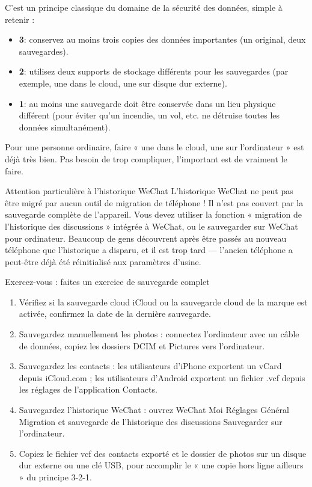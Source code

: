 
C'est un principe classique du domaine de la sécurité des données, simple à retenir :

\begin{itemize}
  \item \textbf{3}: conservez au moins trois copies des données importantes (un original, deux sauvegardes).
  \item \textbf{2}: utilisez deux supports de stockage différents pour les sauvegardes (par exemple, une dans le cloud, une sur disque dur externe).
  \item \textbf{1}: au moins une sauvegarde doit être conservée dans un lieu physique différent (pour éviter qu'un incendie, un vol, etc. ne détruise toutes les données simultanément).
\end{itemize}

Pour une personne ordinaire, faire « une dans le cloud, une sur l'ordinateur » est déjà très bien. Pas besoin de trop compliquer, l'important est de vraiment le faire.

\begin{tcbwarn}{Attention particulière à l'historique WeChat}
L'historique WeChat ne peut pas être migré par aucun outil de migration de téléphone ! Il n'est pas couvert par la sauvegarde complète de l'appareil. Vous devez utiliser la fonction « migration de l'historique des discussions » intégrée à WeChat, ou le sauvegarder sur WeChat pour ordinateur. Beaucoup de gens découvrent après être passés au nouveau téléphone que l'historique a disparu, et il est trop tard — l'ancien téléphone a peut-être déjà été réinitialisé aux paramètres d'usine.

\end{tcbwarn}

\begin{tcbpractice}{Exercez-vous : faites un exercice de sauvegarde complet}
\begin{enumerate}
  \item Vérifiez si la sauvegarde cloud iCloud ou la sauvegarde cloud de la marque est activée, confirmez la date de la dernière sauvegarde.
  \item Sauvegardez manuellement les photos : connectez l'ordinateur avec un câble de données, copiez les dossiers DCIM et Pictures vers l'ordinateur.
  \item Sauvegardez les contacts : les utilisateurs d'iPhone exportent un vCard depuis iCloud.com ; les utilisateurs d'Android exportent un fichier .vcf depuis les réglages de l'application Contacts.
  \item Sauvegardez l'historique WeChat : ouvrez WeChat Moi Réglages Général Migration et sauvegarde de l'historique des discussions Sauvegarder sur l'ordinateur.
  \item Copiez le fichier vcf des contacts exporté et le dossier de photos sur un disque dur externe ou une clé USB, pour accomplir le « une copie hors ligne ailleurs » du principe 3-2-1.
\end{enumerate}

\end{tcbpractice}
